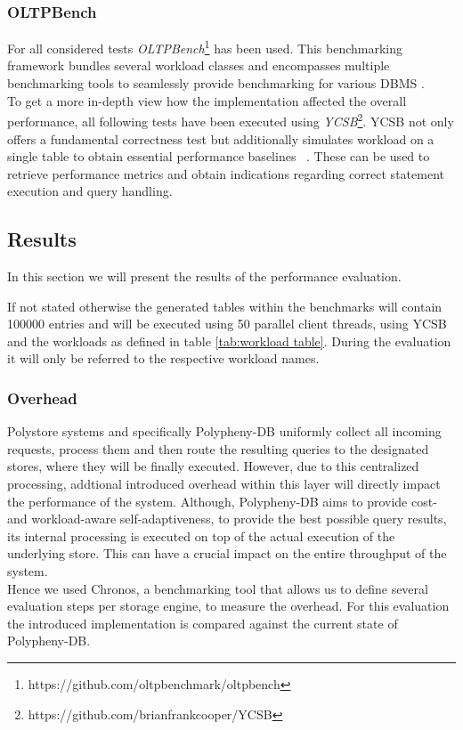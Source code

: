 \subsubsection{OLTPBench}

For all considered tests \textit{OLTPBench}\footnote{https://github.com/oltpbenchmark/oltpbench} 
has been used. This benchmarking framework bundles several workload classes and 
encompasses multiple benchmarking tools to seamlessly provide benchmarking for various DBMS \cite{oltp_2013}.\\
To get a more in-depth view how the implementation affected the overall performance, all following tests have been executed 
using \textit{YCSB}\footnote{https://github.com/brianfrankcooper/YCSB}.
YCSB not only offers a fundamental correctness test but additionally simulates workload on a single table to obtain essential performance baselines ~\cite{ycsb_2010}.
These can be used to retrieve performance metrics and obtain indications regarding correct statement execution and query handling.\\



\subsection{Results}
\label{sec:results}
In this section we will present the results of the performance evaluation.

If not stated otherwise the generated tables within the benchmarks will contain 100000 entries and will be executed using
50 parallel client threads, using YCSB and the workloads as defined in table \ref{tab:workload table}.
During the evaluation it will only be referred to the respective workload names.

%
\subsubsection{Overhead} 
Polystore systems and specifically Polypheny-DB uniformly collect all incoming requests, process them and then
route the resulting queries to the designated stores, where they will be finally executed. 
However, due to this centralized processing, addtional introduced overhead within this layer will directly impact the performance of the system.
Although, Polypheny-DB aims to provide cost- and workload-aware self-adaptiveness, to provide the best possible query results,
its internal processing is executed on top of the actual execution of the underlying store.
This can have a crucial impact on the entire throughput of the system.\\
Hence we used Chronos, a benchmarking tool that allows us to define several evaluation steps per storage engine,
to measure the overhead. For this evaluation the introduced implementation is compared against the current state of Polypheny-DB.\\

